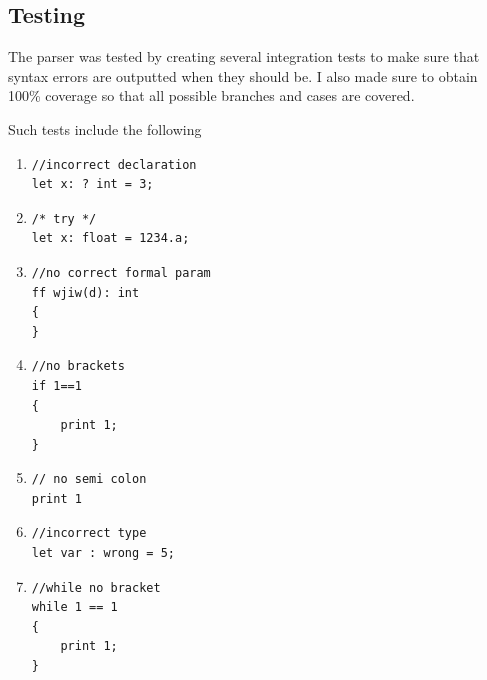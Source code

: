 \documentclass{article}
\begin{document}
				\subsection{Testing}
				
				The parser was tested by creating several integration tests to make sure that syntax errors are outputted when they should be. I also made sure to obtain 100\% coverage so that all possible branches and cases are covered.
				
				Such tests include the following
				
				\begin{enumerate}
				\item 
				\begin{lstlisting}[backgroundcolor=\color{lightgray}]
//incorrect declaration
let x: ? int = 3;
				\end{lstlisting}
				
				\item 
				\begin{lstlisting}[backgroundcolor=\color{lightgray}]
/* try */
let x: float = 1234.a;
				\end{lstlisting}
				
				\item 
				\begin{lstlisting}[backgroundcolor=\color{lightgray}]
//no correct formal param
ff wjiw(d): int
{
}
				\end{lstlisting}
				
				\item 
				\begin{lstlisting}[backgroundcolor=\color{lightgray}]
//no brackets
if 1==1
{
	print 1;
}
				\end{lstlisting}
				
				\item 
				\begin{lstlisting}[backgroundcolor=\color{lightgray}]
// no semi colon
print 1
				\end{lstlisting}
				
				\item 
				\begin{lstlisting}[backgroundcolor=\color{lightgray}]
//incorrect type
let var : wrong = 5;
				\end{lstlisting}
				
				\item 
				\begin{lstlisting}[backgroundcolor=\color{lightgray}]
//while no bracket
while 1 == 1
{
	print 1;
}
				\end{lstlisting}
				

\end{enumerate}
\end{document}
